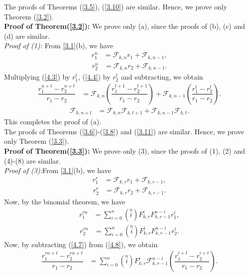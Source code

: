 The proofs of Theorems (\ref{3.5}), (\ref{3.10}) are similar. Hence, we prove only Theorem (\ref{3.2}).\\
\textbf{Proof of Theorem(\ref{3.2}):} We prove only (a), since the proofs of (b), (c) and (d) are similar.\\
\textit{Proof of (1):}
From \ref{3.1}(b), we have
\begin{align}\label{4.3}
r_1^{n}&=\mathcal{F}_{k,n}r_1+\mathcal{F}_{k,n-1},
\end{align}
\begin{align}\label{4.4}
r_2^{n}&=\mathcal{F}_{k,n}r_2+\mathcal{F}_{k,n-1}.
\end{align}
Multiplying (\ref{4.3}) by $r_1^t$, (\ref{4.4}) by $r_2^t$ and subtracting, we obtain \\
\begin{align*}
\dfrac{r_1^{n+t}-r_2^{n+t}}{r_1-r_2}&=\mathcal{F}_{k,n}(\dfrac{r_1^{t+1}-r_2^{t+1}}{r_1-r_2})+\mathcal{F}_{k,n-1}(\dfrac{r_1^{t}-r_2^{t}}{r_1-r_2}).
\end{align*}
\begin{align*}
\mathcal{F}_{k,n+t}&=\mathcal{F}_{k,n}\mathcal{F}_{k,t+1}+\mathcal{F}_{k,n-1}\mathcal{F}_{k,t}.
\end{align*}
This completes the proof of (a).\\
The proofs of Theorems (\ref{3.6})-(\ref{3.8}) and (\ref{3.11}) are similar. Hence, we prove only Theorem (\ref{3.3}).\\
\textbf{Proof of Theorem(\ref{3.3}):} We prove only (3), since the proofs of (1), (2) and (4)-(8) are similar.\\
\textit{Proof of (3):}From \ref{3.1}(b), we have
\begin{align}
r_1^{r}&=\mathcal{F}_{k,r}r_1+\mathcal{F}_{k,r-1},
\end{align}
\begin{align}
r_2^{r}&=\mathcal{F}_{k,r}r_2+\mathcal{F}_{k,r-1}.
\end{align}
Now, by the binomial theorem, we have
\begin{align}\label{4.7}
r_1^{rn}&=\sum\limits_{i=0}^{n}\left( \stackrel{n}{i}\right)F_{k,r}^iF_{k,r-1}^{n-i}r_1^i, 
\end{align}
\begin{align}\label{4.8}
r_2^{rn}&=\sum\limits_{i=0}^{n}\left( \stackrel{n}{i}\right)F_{k,r}^iF_{k,r-1}^{n-i}r_2^i.
\end{align}
Now, by subtracting (\ref{4.7}) from (\ref{4.8}), we obtain 
\begin{align*}
\dfrac{r_1^{rn+t}-r_2^{rn+t}}{r_1-r_2}&=\sum\limits_{i=0}^{n}\left( \stackrel{n}{i}\right)F_{k,r}^i\mathcal{F}_{k,r-1}^{n-i}(\dfrac{r_1^{i+t}-r_2^{i+t}}{r_1-r_2}).
\end{align*}
